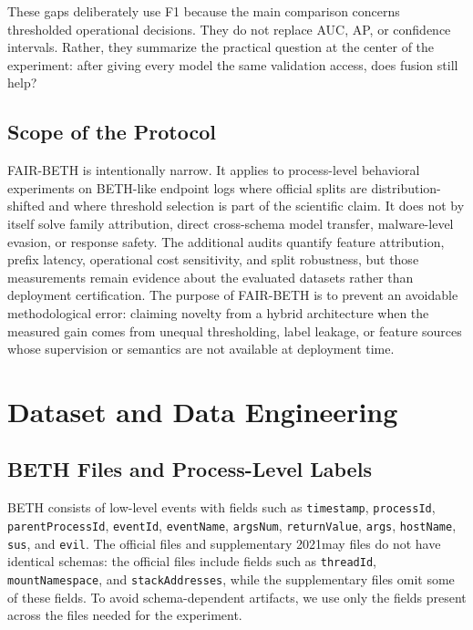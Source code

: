 \documentclass[10pt,journal,compsoc]{IEEEtran}
\begin{document}
These gaps deliberately use F1 because the main comparison concerns thresholded operational decisions. They do not replace AUC, AP, or confidence intervals. Rather, they summarize the practical question at the center of the experiment: after giving every model the same validation access, does fusion still help?

\subsection{Scope of the Protocol}

FAIR-BETH is intentionally narrow. It applies to process-level behavioral experiments on BETH-like endpoint logs where official splits are distribution-shifted and where threshold selection is part of the scientific claim. It does not by itself solve family attribution, direct cross-schema model transfer, malware-level evasion, or response safety. The additional audits quantify feature attribution, prefix latency, operational cost sensitivity, and split robustness, but those measurements remain evidence about the evaluated datasets rather than deployment certification. The purpose of FAIR-BETH is to prevent an avoidable methodological error: claiming novelty from a hybrid architecture when the measured gain comes from unequal thresholding, label leakage, or feature sources whose supervision or semantics are not available at deployment time.

\section{Dataset and Data Engineering}
\label{sec:data}

\subsection{BETH Files and Process-Level Labels}

BETH consists of low-level events with fields such as \texttt{timestamp}, \texttt{processId}, \texttt{parentProcessId}, \texttt{eventId}, \texttt{eventName}, \texttt{argsNum}, \texttt{returnValue}, \texttt{args}, \texttt{hostName}, \texttt{sus}, and \texttt{evil}. The official files and supplementary 2021may files do not have identical schemas: the official files include fields such as \texttt{threadId}, \texttt{mountNamespace}, and \texttt{stackAddresses}, while the supplementary files omit some of these fields. To avoid schema-dependent artifacts, we use only the fields present across the files needed for the experiment.
\end{document}
